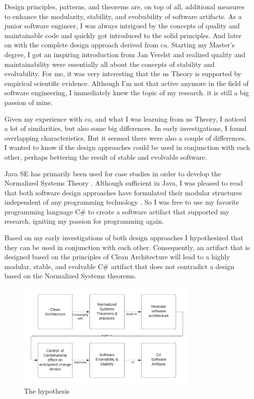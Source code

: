 Design principles, patterns, and theorems are, on top of all, additional measures to
enhance the modularity, stability, and evolvability of software artifacts. As a junior
software engineer, I was always intrigued by the concepts of quality and maintainable code
and quickly got introduced to the \gls{solid} principles. And later on with the complete
design approach derived from \gls{ca}. Starting my Master's degree, I got an
inspiring introduction from Jan Verelst and realized quality and maintainability were
essentially all about the concepts of stability and evolvability. For me, it was very
interesting that the \gls{ns} Theory is supported by empirical scientific evidence.
Although I'm not that active anymore in the field of software engineering, I immediately
knew the topic of my research. it is still a big passion of mine.

Given my experience with \gls{ca}, and what I was learning from \gls{ns} Theory, I noticed
a lot of similarities, but also some big differences. In early investigations, I found
overlapping characteristics. But it seemed there were also a couple of differences. I
wanted to know if the design approaches could be used in conjunction with each other,
perhaps bettering the result of stable and evolvable software.

Java SE has primarily been used for case studies in order to develop the Normalized
Systems Theory \parencite{oorts_building_2014, de_bruyn_enabling_2018}. Although
sufficient in Java, I was pleased to read that both software design approaches have
formulated their modular structures independent of any programming technology
\parencite{mannaert_normalized_2009,robert_c_martin_clean_2018}. So I was free to use my
favorite programming language C\# to create a software artifact that supported my
research, igniting my passion for programming again. 

Based on my early investigations of both design approaches I hypothesized that they can be
used in conjunction with each other. Consequently, an artifact that is designed based on
the principles of Clean Architecture will lead to a highly modular, stable, and evolvable
C\# artifact that does not contradict a design based on the Normalized Systems theorems.

\begin{figure}[H]
    \centering
    \includegraphics[width=0.8\textwidth]{figures/hypothesis.pdf}
    \caption[The hypothesis]{The hypothesis}
    \label{fig_hypothesis}
\end{figure}




%

